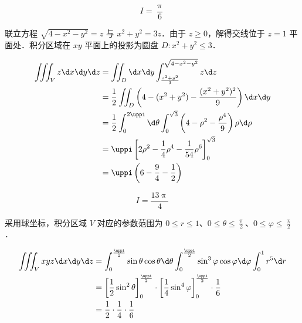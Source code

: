 \begin{solution}
    \begin{equation}
        I = \boxed{\frac{\uppi}{6}}
    \end{equation}

    联立方程 $\sqrt{4-x^{2}-y^{2}}=z$ 与 $x^{2}+y^{2}=3 z$．由于 $z \ge 0$，解得交线位于 $z=1$ 平面处．积分区域在 $xy$ 平面上的投影为圆盘 $D: x^2+y^2 \le 3$．

    \begin{equation}
        \begin{aligned}
            \iiint_{V} z \d x \d y \d z & = \iint_{D} \d x \d y \int_{\frac{x^2+y^2}{3}}^{\sqrt{4-x^2-y^2}} z \d z                                                 \\
                                        & = \frac{1}{2} \iint_{D} \left( 4 - (x^2 + y^2) - \frac{(x^2+y^2)^2}{9} \right) \d x \d y                                 \\
                                        & = \frac{1}{2} \int_{0}^{2 \uppi} \d \theta \int_{0}^{\sqrt{3}} \left( 4 - \rho^2 - \frac{\rho^4}{9} \right) \rho \d \rho \\
                                        & = \uppi \left[ 2 \rho^2 - \frac{1}{4} \rho^4 - \frac{1}{54} \rho^6 \right]_{0}^{\sqrt{3}}                                \\
                                        & = \uppi \left( 6 - \frac{9}{4} - \frac{1}{2} \right) \label{eq:I3}
        \end{aligned}
    \end{equation}

    \begin{equation}
        I = \boxed{\frac{13 \uppi}{4}}
    \end{equation}

    采用球坐标，积分区域 $V$ 对应的参数范围为 $0 \le r \le 1$、$0 \le \theta \le \frac{\uppi}{2}$、$0 \le \varphi \le \frac{\uppi}{2}$．

    \begin{equation}
        \begin{aligned}
            \iiint_{V} x y z \d x \d y \d z & = \int_{0}^{\frac{\uppi}{2}} \sin \theta \cos \theta \d \theta \int_{0}^{\frac{\uppi}{2}} \sin^3 \varphi \cos \varphi \d \varphi \int_{0}^{1} r^5 \d r   \\
                                            & = \left[ \frac{1}{2} \sin^2 \theta \right]_{0}^{\frac{\uppi}{2}} \cdot \left[ \frac{1}{4} \sin^4 \varphi \right]_{0}^{\frac{\uppi}{2}} \cdot \frac{1}{6} \\
                                            & = \frac{1}{2} \cdot \frac{1}{4} \cdot \frac{1}{6} \label{eq:I4}
        \end{aligned}
    \end{equation}


\end{solution}
